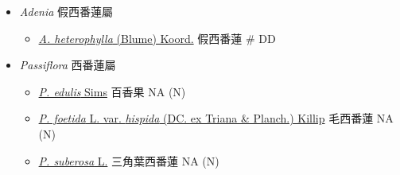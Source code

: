 
  \begin{itemize}
 \item[] \textit{Adenia} 假西番蓮屬
                                
  \begin{itemize}
        \item[] \href{http://www.theplantlist.org/tpl1.1/search?q=Adenia+heterophylla}{\textit{A. heterophylla} (Blume) Koord.}   假西番蓮  \# DD
  \end{itemize}
 \item[] \textit{Passiflora} 西番蓮屬
                                
  \begin{itemize}
        \item[] \href{http://www.theplantlist.org/tpl1.1/search?q=Passiflora+edulis}{\textit{P. edulis} Sims}   百香果   NA (N)
        \item[] \href{http://www.theplantlist.org/tpl1.1/search?q=Passiflora+foetida+var.+hispida}{\textit{P. foetida} L. var. \textit{hispida} (DC. ex Triana \& Planch.) Killip}   毛西番蓮   NA (N)
        \item[] \href{http://www.theplantlist.org/tpl1.1/search?q=Passiflora+suberosa}{\textit{P. suberosa} L.}   三角葉西番蓮   NA (N)
  \end{itemize}
  \end{itemize}
